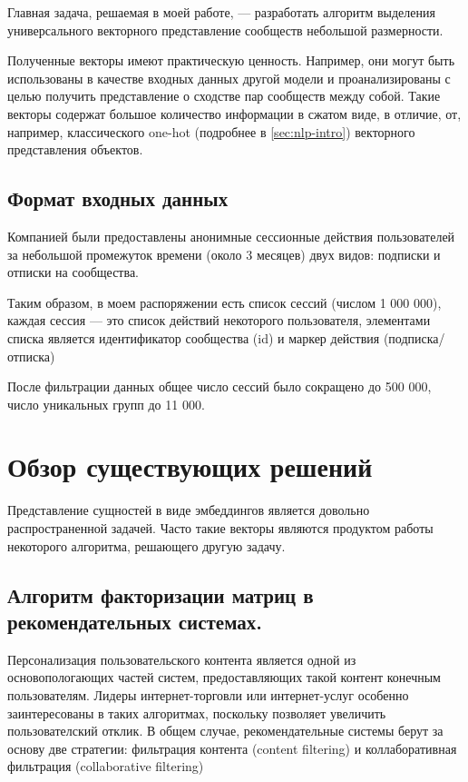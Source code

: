 \documentclass[times,specification,annotation]{itmo-student-thesis}
\begin{document}
Главная задача, решаемая в моей работе, --- разработать алгоритм выделения универсального векторного представление сообществ небольшой размерности. 

Полученные векторы имеют практическую ценность. Например, они могут быть использованы в
качестве входных данных другой модели и проанализированы с целью
получить представление о сходстве пар сообществ между собой. Такие векторы содержат большое количество информации в сжатом виде, в отличие, от, например, классического one-hot (подробнее в \ref{sec:nlp-intro}) векторного представления объектов.

\subsection{Формат входных данных}

Компанией были предоставлены анонимные сессионные действия пользователей за небольшой промежуток времени (около 3 месяцев) двух видов: подписки и отписки на сообщества.

Таким образом, в моем распоряжении есть список сессий (числом 1 000 000), каждая сессия --- это список действий некоторого пользователя, элементами списка является идентификатор сообщества (id) и маркер действия (подписка/отписка)

После фильтрации данных общее число сессий было сокращено до 500 000, число уникальных групп до 11 000.    

\section{Обзор существующих решений}

Представление сущностей в виде эмбеддингов является довольно распространенной задачей. Часто такие векторы являются продуктом работы некоторого алгоритма, решающего другую задачу. 

\subsection{Алгоритм факторизации матриц в рекомендательных системах.}\label{sec:als}

Персонализация пользовательского контента является одной из основопологающих частей систем, предоставляющих такой контент конечным пользователям. Лидеры интернет-торговли или интернет-услуг особенно заинтересованы в таких алгоритмах, поскольку позволяет увеличить пользователский отклик.
В общем случае, рекомендательные системы берут за основу две стратегии: фильтрация контента (content filtering) и коллаборативная фильтрация (collaborative filtering)
  
\end{document}
